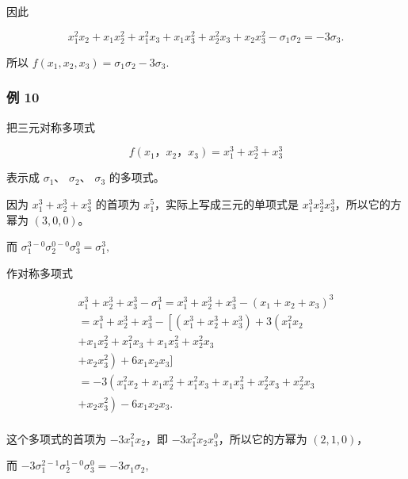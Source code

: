 因此

\[
x _ {1} ^ {2} x _ {2} + x _ {1} x _ {2} ^ {2} + x _ {1} ^ {2} x _ {3} + x _ {1} x _ {3} ^ {2} + x _ {2} ^ {2} x _ {3} + x _ {2} x _ {3} ^ {2} - \sigma_ {1} \sigma_ {2} = - 3 \sigma_ {3}.
\]

所以 \(f(x_{1}, x_{2}, x_{3}) = \sigma_{1} \sigma_{2} - 3 \sigma_{3}.\)

\subsubsection{例 10}

把三元对称多项式

\[
f (x _ {1}\text{，} x _ {2}\text{，} x _ {3}) = x _ {1} ^ {3} + x _ {2} ^ {3} + x _ {3} ^ {3}
\]

表示成 \(\sigma_{1}\)、 \(\sigma_{2}\)、 \(\sigma_{3}\) 的多项式。

 因为 \(x_{1}^{3} + x_{2}^{3} + x_{3}^{3}\) 的首项为
\(x_{1}^{5}\)，实际上写成三元的单项式是
\(x_{1}^{3}x_{2}^{3}x_{3}^{3}\)，所以它的方幂为 \((3,0,0)\)。

而 \(\sigma_1^{3 - 0}\sigma_2^{0 - 0}\sigma_3^0 = \sigma_1^3,\)

作对称多项式

\[
\begin{array}{l} x _ {1} ^ {3} + x _ {2} ^ {3} + x _ {3} ^ {3} - \sigma_ {1} ^ {3} = x _ {1} ^ {3} + x _ {2} ^ {3} + x _ {3} ^ {3} - (x _ {1} + x _ {2} + x _ {3}) ^ {3} \\ = x _ {1} ^ {3} + x _ {2} ^ {3} + x _ {3} ^ {3} - \left[ \left(x _ {1} ^ {3} + x _ {2} ^ {3} + x _ {3} ^ {3}\right) + 3 \left(x _ {1} ^ {2} x _ {2} \right. \right. \\ + x _ {1} x _ {2} ^ {2} + x _ {1} ^ {2} x _ {3} + x _ {1} x _ {3} ^ {2} + x _ {2} ^ {2} x _ {3} \\ \left. + x _ {2} x _ {3} ^ {2}\right) + 6 x _ {1} x _ {2} x _ {3} ] \\ = - 3 \left(x _ {1} ^ {2} x _ {2} + x _ {1} x _ {2} ^ {2} + x _ {1} ^ {2} x _ {3} + x _ {1} x _ {3} ^ {2} + x _ {2} ^ {2} x _ {3} + x _ {2} ^ {2} x _ {3} \right. \\ \left. + x _ {2} x _ {3} ^ {2}\right) - 6 x _ {1} x _ {2} x _ {3}. \\ \end{array}
\]

这个多项式的首项为 \(-3x_{1}^{2}x_{2}\)，即
\(-3x_{1}^{2}x_{2}x_{3}^{0}\)，所以它的方幂为 \((2,1,0)\)，

而
\(-3\sigma_{1}^{2-1}\sigma_{2}^{1-0}\sigma_{3}^{0} = -3\sigma_{1}\sigma_{2},\)

